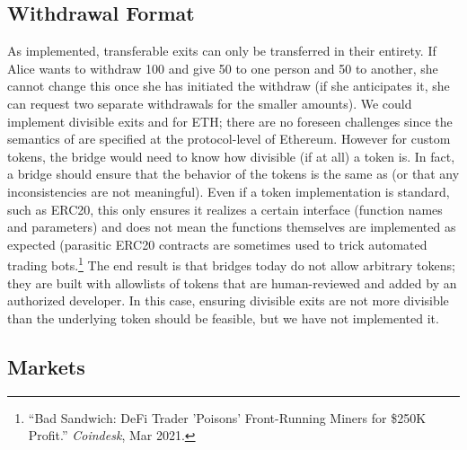 
\subsection{Withdrawal Format}

As implemented, transferable exits can only be transferred in their entirety. If Alice wants to withdraw 100 \ethtwo and give 50 \ethxx to one person and 50 \ethxx to another, she cannot change this once she has initiated the withdraw (if she anticipates it, she can request two separate withdrawals for the smaller amounts). We could implement divisible exits and for ETH; there are no foreseen challenges since the semantics of \ethone are specified at the protocol-level of Ethereum. However for custom tokens, the bridge would need to know how divisible (if at all) a token is. In fact, a bridge should ensure that the \layertwo  behavior of the tokens is the same as \layerone (or that any inconsistencies are not meaningful). Even if a token implementation is standard, such as ERC20, this only ensures it realizes a certain interface (function names and parameters) and does not mean the functions themselves are implemented as expected (parasitic ERC20 contracts are sometimes used to trick automated trading bots.\footnote{``Bad Sandwich: DeFi Trader 'Poisons' Front-Running Miners for \$250K Profit.'' \textit{Coindesk}, Mar 2021.} The end result is that bridges today do not allow arbitrary tokens; they are built with allowlists of tokens that are human-reviewed and added by an authorized developer. In this case, ensuring divisible exits are not more divisible than the underlying token should be feasible, but we have not implemented it.

\subsection{Markets}
\label{sec:uniswap}

